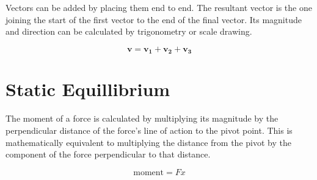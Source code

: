 \documentclass[revision-guide.tex]{subfiles}
\begin{document}

Vectors can be added by placing them end to end. The resultant vector is the one joining the start of the first vector to the end of the final vector. Its magnitude and direction can be calculated by trigonometry or scale drawing.

\begin{figure}[h]
	\begin{center}
	$$\mathbf{v} = \mathbf{v_1}+\mathbf{v_2}+\mathbf{v_3}$$
	\end{center}
\end{figure}

\section{Static Equillibrium}


The moment of a force is calculated by multiplying its magnitude by the perpendicular distance of the force's line of action to the pivot point. This is mathematically equivalent to multiplying the distance from the pivot by the component of the force perpendicular to that distance.

\begin{figure}[h]
	\centering
	$$\mathrm{moment} = Fx $$
\end{figure}
\end{document}
